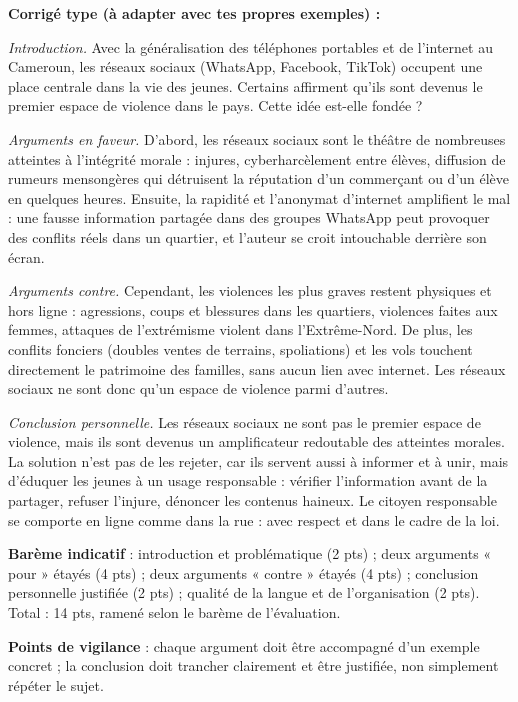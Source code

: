 \documentclass[11pt]{article}
\begin{document}
\begin{corrige}
\textbf{Corrigé type (à adapter avec tes propres exemples) :}

\emph{Introduction.} Avec la généralisation des téléphones portables et de l'internet au Cameroun, les réseaux sociaux (WhatsApp, Facebook, TikTok) occupent une place centrale dans la vie des jeunes. Certains affirment qu'ils sont devenus le premier espace de violence dans le pays. Cette idée est-elle fondée ?

\emph{Arguments en faveur.} D'abord, les réseaux sociaux sont le théâtre de nombreuses atteintes à l'intégrité morale : injures, cyberharcèlement entre élèves, diffusion de rumeurs mensongères qui détruisent la réputation d'un commerçant ou d'un élève en quelques heures. Ensuite, la rapidité et l'anonymat d'internet amplifient le mal : une fausse information partagée dans des groupes WhatsApp peut provoquer des conflits réels dans un quartier, et l'auteur se croit intouchable derrière son écran.

\emph{Arguments contre.} Cependant, les violences les plus graves restent physiques et hors ligne : agressions, coups et blessures dans les quartiers, violences faites aux femmes, attaques de l'extrémisme violent dans l'Extrême-Nord. De plus, les conflits fonciers (doubles ventes de terrains, spoliations) et les vols touchent directement le patrimoine des familles, sans aucun lien avec internet. Les réseaux sociaux ne sont donc qu'un espace de violence parmi d'autres.

\emph{Conclusion personnelle.} Les réseaux sociaux ne sont pas le premier espace de violence, mais ils sont devenus un amplificateur redoutable des atteintes morales. La solution n'est pas de les rejeter, car ils servent aussi à informer et à unir, mais d'éduquer les jeunes à un usage responsable : vérifier l'information avant de la partager, refuser l'injure, dénoncer les contenus haineux. Le citoyen responsable se comporte en ligne comme dans la rue : avec respect et dans le cadre de la loi.

\textbf{Barème indicatif} : introduction et problématique (2 pts) ; deux arguments « pour » étayés (4 pts) ; deux arguments « contre » étayés (4 pts) ; conclusion personnelle justifiée (2 pts) ; qualité de la langue et de l'organisation (2 pts). Total : 14 pts, ramené selon le barème de l'évaluation.

\textbf{Points de vigilance} : chaque argument doit être accompagné d'un exemple concret ; la conclusion doit trancher clairement et être justifiée, non simplement répéter le sujet.
\end{corrige}
\end{document}

